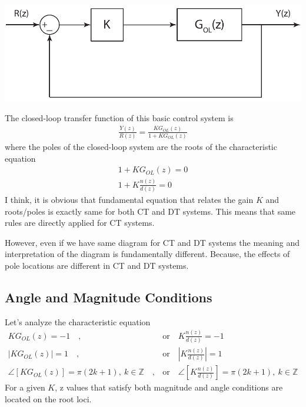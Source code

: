 \documentclass[twoside]{article}
\begin{document}
\begin{center}
\begin{minipage}[h]{0.7\linewidth}
    \begin{center}
      \includegraphics[width=\textwidth]{dist}
    \end{center}
\end{minipage}
\end{center}

The closed-loop transfer function of this basic control system is
%
\begin{align*}
\frac{Y(z)}{R(z)} = \frac{K G_{OL}(z)}{1 + K G_{OL}(z)}
\end{align*}
%
where the poles of the closed-loop system are
the roots of the characteristic equation 
%
\begin{align*}
1 + K G_{OL}(z) = 0 
\\
1 + K \frac{n(z)}{d(z)} = 0 
\end{align*}
%
I think, it is obvious that fundamental 
equation that relates the gain $K$ and roots/poles
is exactly same for both CT and DT systems.
This means that same rules are directly applied 
for CT systems. 

However, even if we have same diagram for CT and DT 
systems the meaning and interpretation of the diagram
is fundamentally different. Because, the effects of pole 
locations are different in CT and DT systems. 

\subsection*{Angle and Magnitude Conditions}

Let's analyze the characteristic equation 
%
\begin{align*}
K G_{OL}(z) = -1 \quad , &\mathrm{or} \quad K \frac{n(z)}{d(z)} = -1 
\\
| K G_{OL}(z) | = 1 \quad , &\mathrm{or} \quad \left| K \frac{n(z)}{d(z)} \right| = 1 
\\
\angle [ K G_{OL}(z) ] = \pi (2 k + 1) , \ k \in \mathbb{Z} \quad ,
  &\mathrm{or} \quad \angle \left[ K \frac{n(z)}{d(z)} \right] = \pi (2 k + 1), \ k \in \mathbb{Z} 
\end{align*}
%
For a given $K$, z values that satisfy both magnitude and angle
conditions are located on the root loci.
\end{document}
